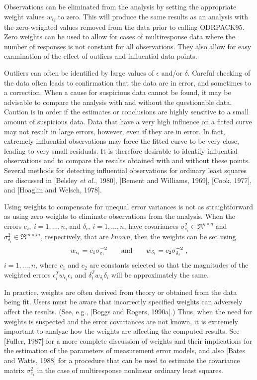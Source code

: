 \noindent Observations can be eliminated from the analysis by setting the
appropriate weight values $w_{\epsilon_{i}}$ to zero. This will produce the same
results as an analysis with the zero-weighted values removed from the data prior
to calling ODRPACK95. Zero weights can be used to allow for cases of multiresponse data where the number of responses is not constant for all observations. They also allow for easy examination of the effect of outliers and influential data points.

\noindent Outliers can often be identified by large values of $\epsilon$ and/or $\delta$. Careful checking of the data often leads to confirmation that the data are in error, and sometimes to a correction. When a cause for suspicious data cannot be found, it may be advisable to compare the analysis with and without the questionable data. Caution is in order if the estimates or conclusions are highly sensitive to a small amount of suspicious data. Data that have a very high influence on a fitted curve may not result in large errors, however, even if they are in error. In fact, extremely influential observations may force the fitted curve to be very close, leading to very small residuals. It is therefore desirable to identify influential observations and to compare the results obtained with and without these points. Several methods for detecting influential observations for ordinary least squares are discussed in [Belsley {\it et al.}, 1980], [Bement and Williams, 1969], [Cook, 1977], and [Hoaglin and Welsch, 1978].

\noindent Using weights to compensate for unequal error variances is not as straightforward as using zero weights to eliminate observations from the analysis. When the errors $e_{i},\ i=1,\ldots,n$, and $\delta_{i},\ i=1,\ldots,n$, have covariances $\sigma_{e_{i}}^{2}\in\Re^{q\times q}$ and $\sigma_{\delta_{i}}^{2}\in\Re^{m\times m}$, respectively, that are {\it known}, then the weights can be set using
$$w_{\epsilon_{i}}=c_{1}\sigma_{e_{i}}^{-2}\qquad {\rm and}\qquad
w_{\delta_{i}}=c_{2}\sigma_{\delta_{i}}^{-2}\ ,$$
$i=1,\ldots,n$, where $c_1$ and $c_2$ are constants selected so that the magnitudes of the weighted errors
$\epsilon_{i}^{T}w_{\epsilon_{i}}\epsilon_{i}$ and
$\delta_{i}^{T}w_{\delta_{i}}\delta_{i}$ will be approximately the same.

\noindent In practice, weights are often derived from theory or obtained from the data being fit. Users must be aware that incorrectly specified weights can adversely affect the results. (See, e.g., [Boggs and Rogers, 1990a].) Thus, when the need for weights is suspected and the error covariances are not known, it is extremely important to analyze how the weights are affecting the computed results. See [Fuller, 1987] for a more complete discussion of weights and their implications for the estimation of the parameters of measurement error models, and also [Bates and Watts, 1988] for a procedure that can be used to estimate the covariance matrix $\sigma_{e_{i}}^{2}$ in the case of multiresponse nonlinear ordinary least squares.

